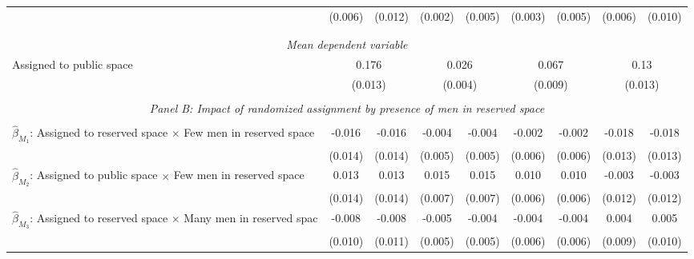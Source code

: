 \begin{tabular}{l*{8}{c}}
                    &     (0.006)         &     (0.012)         &     (0.002)         &     (0.005)         &     (0.003)         &     (0.005)         &     (0.006)         &     (0.010)         \\
\\[-1.8ex] \hline \\[-1.8ex] \multicolumn{9}{c}{\textit{Mean dependent variable}} \\ Assigned to public space & \multicolumn{2}{c}{0.176} & \multicolumn{2}{c}{0.026} & \multicolumn{2}{c}{0.067} & \multicolumn{2}{c}{0.13} \\ \, & \multicolumn{2}{c}{(0.013)} & \multicolumn{2}{c}{(0.004)} & \multicolumn{2}{c}{(0.009)} & \multicolumn{2}{c}{(0.013)} \\ 

\hline \\[-1ex] \multicolumn{9}{c}{\textit{Panel B: Impact of randomized assignment by presence of men in reserved space}} \\\\[-1ex]
$\hat\beta_{M_1}$: Assigned to reserved space $\times$ Few men in reserved space&      -0.016         &      -0.016         &      -0.004         &      -0.004         &      -0.002         &      -0.002         &      -0.018         &      -0.018         \\
                    &     (0.014)         &     (0.014)         &     (0.005)         &     (0.005)         &     (0.006)         &     (0.006)         &     (0.013)         &     (0.013)         \\
[1em]
$\hat\beta_{M_2}$: Assigned to public space $\times$ Few men in reserved space&       0.013         &       0.013         &       0.015\sym{**} &       0.015\sym{**} &       0.010         &       0.010         &      -0.003         &      -0.003         \\
                    &     (0.014)         &     (0.014)         &     (0.007)         &     (0.007)         &     (0.006)         &     (0.006)         &     (0.012)         &     (0.012)         \\
[1em]
$\hat\beta_{M_3}$: Assigned to reserved space $\times$ Many men in reserved spac&      -0.008         &      -0.008         &      -0.005         &      -0.004         &      -0.004         &      -0.004         &       0.004         &       0.005         \\
                    &     (0.010)         &     (0.011)         &     (0.005)         &     (0.005)         &     (0.006)         &     (0.006)         &     (0.009)         &     (0.010)         \\

\end{tabular}
